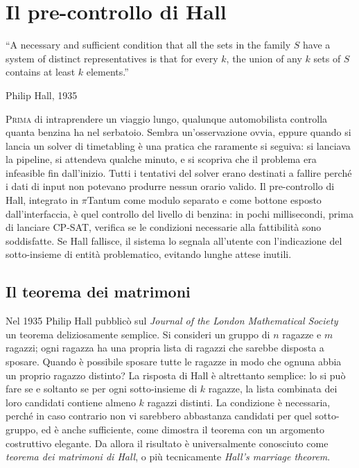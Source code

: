 \chapter{Il pre-controllo di Hall}
\label{ch:metodo_hall}


\epigraph{``A necessary and sufficient condition that all the
sets in the family $S$ have a system of distinct
representatives is that for every $k$, the union of any $k$
sets of $S$ contains at least $k$ elements.''}{Philip Hall,
1935~\parencite{hall1935}}

\lettrine[lines=3]{P}{rima} di intraprendere un viaggio
lungo, qualunque automobilista controlla quanta benzina ha
nel serbatoio. Sembra un'osservazione ovvia, eppure quando si
lancia un solver di timetabling \`e una pratica che
raramente si seguiva: si lanciava la pipeline, si attendeva
qualche minuto, e si scopriva che il problema era infeasible
fin dall'inizio. Tutti i tentativi del solver erano destinati
a fallire perch\'e i dati di input non potevano produrre
nessun orario valido. Il pre-controllo di Hall, integrato in
$\pi$Tantum come modulo separato e come bottone esposto
dall'interfaccia, \`e quel controllo del livello di benzina:
in pochi millisecondi, prima di lanciare CP-SAT, verifica se
le condizioni necessarie alla fattibilit\`a sono soddisfatte.
Se Hall fallisce, il sistema lo segnala all'utente con
l'indicazione del sotto-insieme di entit\`a problematico,
evitando lunghe attese inutili.

\section{Il teorema dei matrimoni}

\begin{storiabox}
Nel 1935 Philip Hall pubblic\`o sul \emph{Journal of the
London Mathematical Society}~\parencite{hall1935} un teorema
deliziosamente semplice. Si consideri un gruppo di $n$
ragazze e $m$ ragazzi; ogni ragazza ha una propria lista di
ragazzi che sarebbe disposta a sposare. Quando \`e possibile
sposare tutte le ragazze in modo che ognuna abbia un
proprio ragazzo distinto? La risposta di Hall \`e altrettanto
semplice: lo si pu\`o fare se e soltanto se per ogni
sotto-insieme di $k$ ragazze, la lista combinata dei loro
candidati contiene almeno $k$ ragazzi distinti. La condizione
\`e necessaria, perch\'e in caso contrario non vi sarebbero
abbastanza candidati per quel sotto-gruppo, ed \`e anche
sufficiente, come dimostra il teorema con un argomento
costruttivo elegante. Da allora il risultato \`e
universalmente conosciuto come \emph{teorema dei matrimoni di
Hall}, o pi\`u tecnicamente \emph{Hall's marriage theorem}.
\end{storiabox}

